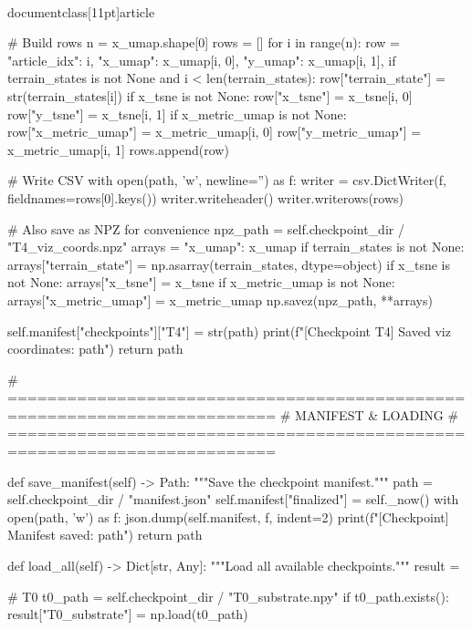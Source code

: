 \\documentclass[11pt]{article}
\begin{document}
\begin{CodeBlock}
        # Build rows
        n = x_umap.shape[0]
        rows = []
        for i in range(n):
            row = {
                "article_idx": i,
                "x_umap": x_umap[i, 0],
                "y_umap": x_umap[i, 1],
            }
            if terrain_states is not None and i < len(terrain_states):
                row["terrain_state"] = str(terrain_states[i])
            if x_tsne is not None:
                row["x_tsne"] = x_tsne[i, 0]
                row["y_tsne"] = x_tsne[i, 1]
            if x_metric_umap is not None:
                row["x_metric_umap"] = x_metric_umap[i, 0]
                row["y_metric_umap"] = x_metric_umap[i, 1]
            rows.append(row)

        # Write CSV
        with open(path, 'w', newline='') as f:
            writer = csv.DictWriter(f, fieldnames=rows[0].keys())
            writer.writeheader()
            writer.writerows(rows)

        # Also save as NPZ for convenience
        npz_path = self.checkpoint_dir / "T4_viz_coords.npz"
        arrays = {"x_umap": x_umap}
        if terrain_states is not None:
            arrays["terrain_state"] = np.asarray(terrain_states, dtype=object)
        if x_tsne is not None:
            arrays["x_tsne"] = x_tsne
        if x_metric_umap is not None:
            arrays["x_metric_umap"] = x_metric_umap
        np.savez(npz_path, **arrays)

        self.manifest["checkpoints"]["T4"] = str(path)
        print(f"[Checkpoint T4] Saved viz coordinates: {path}")
        return path

    # =========================================================================
    # MANIFEST & LOADING
    # =========================================================================

    def save_manifest(self) -> Path:
        """Save the checkpoint manifest."""
        path = self.checkpoint_dir / "manifest.json"
        self.manifest["finalized"] = self._now()
        with open(path, 'w') as f:
            json.dump(self.manifest, f, indent=2)
        print(f"[Checkpoint] Manifest saved: {path}")
        return path

    def load_all(self) -> Dict[str, Any]:
        """Load all available checkpoints."""
        result = {}

        # T0
        t0_path = self.checkpoint_dir / "T0_substrate.npy"
        if t0_path.exists():
            result["T0_substrate"] = np.load(t0_path)


\end{CodeBlock}
\end{document}
